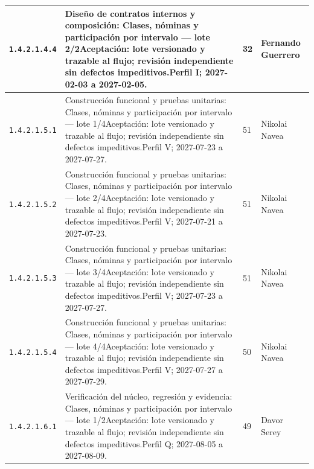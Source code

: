 \begin{longtable}{L{29mm}L{80mm}R{12mm}L{28mm}}
\texttt{1.\allowbreak{}4.\allowbreak{}2.\allowbreak{}1.\allowbreak{}4.\allowbreak{}4} & Diseño de contratos internos y composición: Clases, nóminas y participación por intervalo — lote 2/2\newline Aceptación: lote versionado y trazable al flujo; revisión independiente sin defectos impeditivos.\newline Perfil I; 2027-02-03 a 2027-02-05. & 32 & Fernando Guerrero\\\hline
\texttt{1.\allowbreak{}4.\allowbreak{}2.\allowbreak{}1.\allowbreak{}5.\allowbreak{}1} & Construcción funcional y pruebas unitarias: Clases, nóminas y participación por intervalo — lote 1/4\newline Aceptación: lote versionado y trazable al flujo; revisión independiente sin defectos impeditivos.\newline Perfil V; 2027-07-23 a 2027-07-27. & 51 & Nikolai Navea\\\hline
\texttt{1.\allowbreak{}4.\allowbreak{}2.\allowbreak{}1.\allowbreak{}5.\allowbreak{}2} & Construcción funcional y pruebas unitarias: Clases, nóminas y participación por intervalo — lote 2/4\newline Aceptación: lote versionado y trazable al flujo; revisión independiente sin defectos impeditivos.\newline Perfil V; 2027-07-21 a 2027-07-23. & 51 & Nikolai Navea\\\hline
\texttt{1.\allowbreak{}4.\allowbreak{}2.\allowbreak{}1.\allowbreak{}5.\allowbreak{}3} & Construcción funcional y pruebas unitarias: Clases, nóminas y participación por intervalo — lote 3/4\newline Aceptación: lote versionado y trazable al flujo; revisión independiente sin defectos impeditivos.\newline Perfil V; 2027-07-23 a 2027-07-27. & 51 & Nikolai Navea\\\hline
\texttt{1.\allowbreak{}4.\allowbreak{}2.\allowbreak{}1.\allowbreak{}5.\allowbreak{}4} & Construcción funcional y pruebas unitarias: Clases, nóminas y participación por intervalo — lote 4/4\newline Aceptación: lote versionado y trazable al flujo; revisión independiente sin defectos impeditivos.\newline Perfil V; 2027-07-27 a 2027-07-29. & 50 & Nikolai Navea\\\hline
\texttt{1.\allowbreak{}4.\allowbreak{}2.\allowbreak{}1.\allowbreak{}6.\allowbreak{}1} & Verificación del núcleo, regresión y evidencia: Clases, nóminas y participación por intervalo — lote 1/2\newline Aceptación: lote versionado y trazable al flujo; revisión independiente sin defectos impeditivos.\newline Perfil Q; 2027-08-05 a 2027-08-09. & 49 & Davor Serey\\\hline

\end{longtable}
